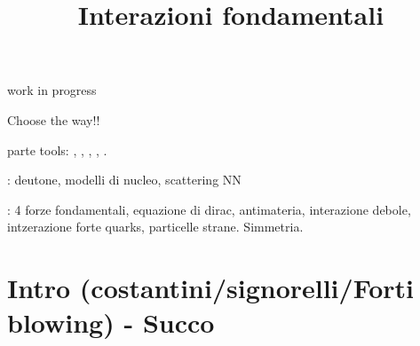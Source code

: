 \documentclass[10pt,xcolor={usenames},fleqn,mathserif,serif]{beamer}
\title{Interazioni fondamentali}
\begin{document}

\begin{wordonframe}{work in progress}

Choose the way!!

    parte tools: , , , , .
    
    : deutone, modelli di nucleo, scattering NN
    
    
    : 4 forze fondamentali,  equazione di dirac, antimateria, interazione debole, intzerazione forte quarks, particelle strane. Simmetria.
    
    
\end{wordonframe}

\begin{frame}
  \titlepage
  \tableofcontents[onlyparts]

\end{frame}


\part{Intro (costantini/signorelli/Forti blowing) - Succo}


\end{document}
